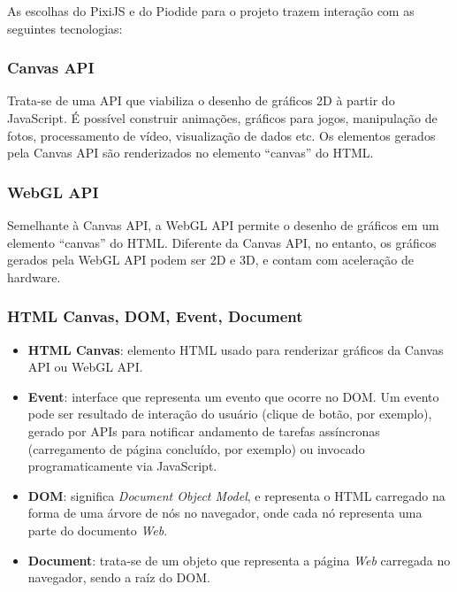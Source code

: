 \begin{apendicesenv}
As escolhas do PixiJS e do Piodide para o projeto trazem interação com as seguintes tecnologias:

\subsubsection{Canvas API}
Trata-se de uma API que viabiliza o desenho de gráficos 2D à partir do JavaScript. É possível construir animações, gráficos para jogos, manipulação de fotos, processamento de vídeo, visualização de dados etc. Os elementos gerados pela Canvas API são renderizados no elemento ``canvas'' do HTML.

\subsubsection{WebGL API}

Semelhante à Canvas API, a WebGL API permite o desenho de gráficos em um elemento ``canvas'' do HTML.
Diferente da Canvas API, no entanto, os gráficos gerados pela WebGL API podem ser 2D e 3D, e contam
com aceleração de hardware.

\subsubsection{HTML Canvas, DOM, Event, Document}

\begin{itemize}

	\item \textbf{HTML Canvas}: elemento HTML usado para renderizar gráficos da Canvas API ou WebGL API.
	\item  \textbf{Event}: interface que representa um evento que ocorre no DOM. Um evento pode ser resultado
	de interação do usuário (clique de botão, por exemplo), gerado por APIs para notificar andamento
	de tarefas assíncronas (carregamento de página concluído, por exemplo) ou invocado programaticamente
	via JavaScript.
	\item  \textbf{DOM}: significa \textit{Document Object Model}, e representa o HTML carregado na
	forma de uma árvore de nós no navegador, onde cada nó representa uma parte do documento \textit{Web}.
	\item \textbf{Document}: trata-se de um objeto que representa a página \textit{Web} carregada no
	navegador, sendo a raíz do DOM.

\end{itemize}

%
%


\end{apendicesenv}
